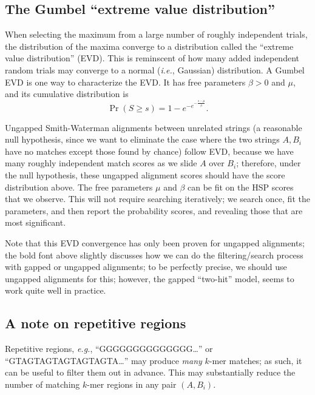 \documentclass[12pt]{book}
\begin{document}
\subsection{The Gumbel ``extreme value distribution''}
When selecting the maximum from a large number of roughly independent
trials, the distribution of the maxima converge to a distribution
called the ``extreme value distribution'' (EVD). This is reminscent of
how many added independent random trials may converge to a normal
(\emph{i.e.}, Gaussian) distribution. A Gumbel EVD is one way to
characterize the EVD. It has free parameters $\beta>0$ and $\mu$, and
its cumulative distribution is
\[
\Pr(S\geq s) = 1-e^{-e^{-\frac{s-\mu}{\beta}}}.
\]

Ungapped Smith-Waterman alignments between unrelated strings (a
reasonable null hypothesis, since we want to eliminate the case where
the two strings $A,B_i$ have no matches except those found by chance)
follow EVD, because we have many roughly independent match scores as
we slide $A$ over $B_i$; therefore, under the null hypothesis, these
ungapped alignment scores should have the score distribution
above. The free parameters $\mu$ and $\beta$ can be fit on the HSP
scores that we observe. This will not require searching iteratively;
we search once, fit the parameters, and then report the probability
scores, and revealing those that are most significant.

Note that this EVD convergence has only been proven for ungapped
alignments; the bold font above slightly discusses how we can do the
filtering/search process with gapped or ungapped alignments; to be
perfectly precise, we should use ungapped alignments for this;
however, the gapped ``two-hit'' model, seems to work quite well in
practice.

\subsection{A note on repetitive regions}
Repetitive regions, \emph{e.g.}, ``GGGGGGGGGGGGGG\ldots'' or
``GTAGTAGTAGTAGTAGTA\ldots'' may produce \emph{many} $k$-mer matches;
as such, it can be useful to filter them out in advance. This may
substantially reduce the number of matching $k$-mer regions in any
pair $(A,B_i)$.
\end{document}
